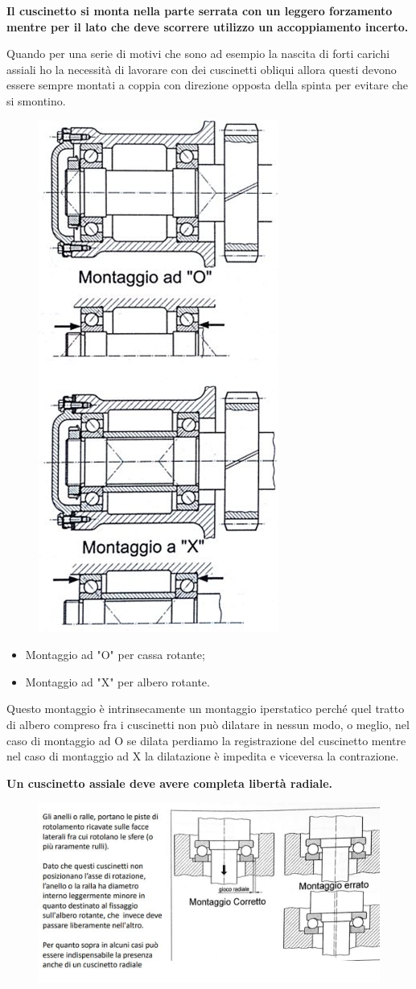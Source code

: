 \documentclass[a4paper, 15pt]{article}
\begin{document}
			\begin{center}
				\textbf{Il cuscinetto si monta nella parte serrata con un leggero forzamento mentre per il lato che deve scorrere utilizzo un accoppiamento incerto.}
			\end{center}
			
			Quando per una serie di motivi che sono ad esempio la nascita di forti carichi assiali ho la necessità di lavorare con dei cuscinetti obliqui allora questi devono essere sempre montati a coppia con direzione opposta della spinta per evitare che si smontino.
			\begin{figure}[H]
				\centering
				\includegraphics[width=0.15\linewidth]{immagini/screenshot013}
				\label{fig:screenshot013}
			\end{figure}
			
			\begin{itemize}
				\item Montaggio ad "O" per cassa rotante;
				\item Montaggio ad "X" per albero rotante.
			\end{itemize}
			
			Questo montaggio è intrinsecamente un montaggio iperstatico perché quel tratto di albero compreso fra i cuscinetti non può dilatare in nessun modo, o meglio, nel caso di montaggio ad O se dilata perdiamo la registrazione del cuscinetto mentre nel caso di montaggio ad X la dilatazione è impedita e viceversa la contrazione.  
\newpage			
			\begin{center}
				\textbf{Un cuscinetto assiale deve avere completa libertà radiale.}
			\end{center}
			
			\begin{figure}[H]
				\centering
				\includegraphics[width=0.5\linewidth]{immagini/screenshot014}
				\label{fig:screenshot014}
			\end{figure}
			
\end{document}

